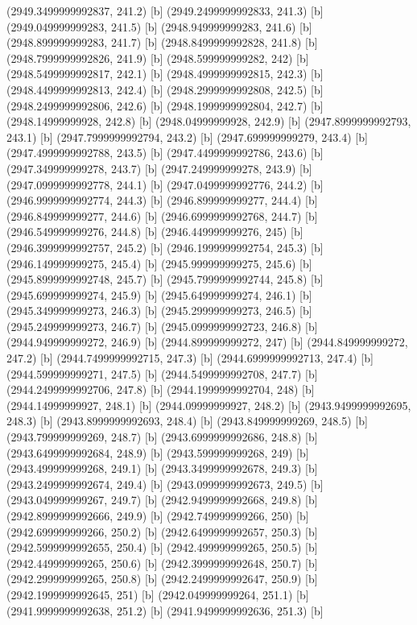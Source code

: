 {{{(2949.3499999992837, 241.2) [b] 
(2949.2499999992833, 241.3) [b] 
(2949.049999999283, 241.5) [b] 
(2948.949999999283, 241.6) [b] 
(2948.899999999283, 241.7) [b] 
(2948.8499999992828, 241.8) [b] 
(2948.7999999992826, 241.9) [b] 
(2948.599999999282, 242) [b] 
(2948.5499999992817, 242.1) [b] 
(2948.4999999992815, 242.3) [b] 
(2948.4499999992813, 242.4) [b] 
(2948.2999999992808, 242.5) [b] 
(2948.2499999992806, 242.6) [b] 
(2948.1999999992804, 242.7) [b] 
(2948.14999999928, 242.8) [b] 
(2948.04999999928, 242.9) [b] 
(2947.8999999992793, 243.1) [b] 
(2947.7999999992794, 243.2) [b] 
(2947.699999999279, 243.4) [b] 
(2947.4999999992788, 243.5) [b] 
(2947.4499999992786, 243.6) [b] 
(2947.349999999278, 243.7) [b] 
(2947.249999999278, 243.9) [b] 
(2947.0999999992778, 244.1) [b] 
(2947.0499999992776, 244.2) [b] 
(2946.9999999992774, 244.3) [b] 
(2946.899999999277, 244.4) [b] 
(2946.849999999277, 244.6) [b] 
(2946.6999999992768, 244.7) [b] 
(2946.549999999276, 244.8) [b] 
(2946.449999999276, 245) [b] 
(2946.3999999992757, 245.2) [b] 
(2946.1999999992754, 245.3) [b] 
(2946.149999999275, 245.4) [b] 
(2945.999999999275, 245.6) [b] 
(2945.8999999992748, 245.7) [b] 
(2945.7999999992744, 245.8) [b] 
(2945.699999999274, 245.9) [b] 
(2945.649999999274, 246.1) [b] 
(2945.349999999273, 246.3) [b] 
(2945.299999999273, 246.5) [b] 
(2945.249999999273, 246.7) [b] 
(2945.0999999992723, 246.8) [b] 
(2944.949999999272, 246.9) [b] 
(2944.899999999272, 247) [b] 
(2944.849999999272, 247.2) [b] 
(2944.7499999992715, 247.3) [b] 
(2944.6999999992713, 247.4) [b] 
(2944.599999999271, 247.5) [b] 
(2944.5499999992708, 247.7) [b] 
(2944.2499999992706, 247.8) [b] 
(2944.1999999992704, 248) [b] 
(2944.14999999927, 248.1) [b] 
(2944.09999999927, 248.2) [b] 
(2943.9499999992695, 248.3) [b] 
(2943.8999999992693, 248.4) [b] 
(2943.849999999269, 248.5) [b] 
(2943.799999999269, 248.7) [b] 
(2943.6999999992686, 248.8) [b] 
(2943.6499999992684, 248.9) [b] 
(2943.599999999268, 249) [b] 
(2943.499999999268, 249.1) [b] 
(2943.3499999992678, 249.3) [b] 
(2943.2499999992674, 249.4) [b] 
(2943.0999999992673, 249.5) [b] 
(2943.049999999267, 249.7) [b] 
(2942.9499999992668, 249.8) [b] 
(2942.8999999992666, 249.9) [b] 
(2942.749999999266, 250) [b] 
(2942.699999999266, 250.2) [b] 
(2942.6499999992657, 250.3) [b] 
(2942.5999999992655, 250.4) [b] 
(2942.499999999265, 250.5) [b] 
(2942.449999999265, 250.6) [b] 
(2942.3999999992648, 250.7) [b] 
(2942.299999999265, 250.8) [b] 
(2942.2499999992647, 250.9) [b] 
(2942.1999999992645, 251) [b] 
(2942.049999999264, 251.1) [b] 
(2941.9999999992638, 251.2) [b] 
(2941.9499999992636, 251.3) [b] 
}}}
